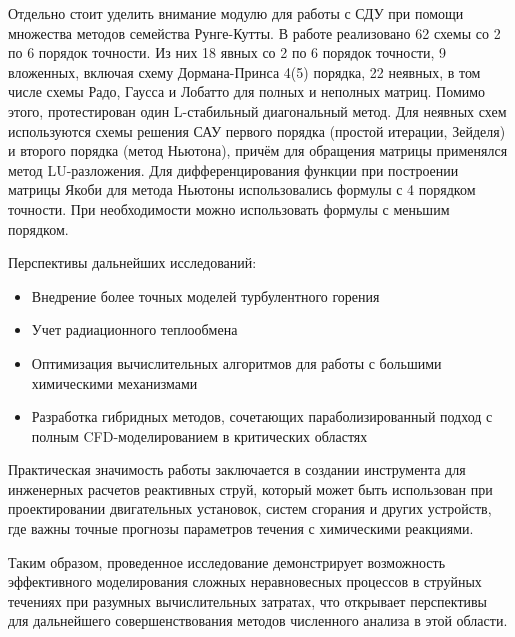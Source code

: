 Отдельно стоит уделить внимание модулю для работы с СДУ при помощи множества методов семейства Рунге-Кутты. В работе реализовано 62 схемы со 2 по 6 порядок точности. Из них 18 явных со 2 по 6 порядок точности, 9 вложенных, включая схему Дормана-Принса 4(5) порядка, 22 неявных, в том числе схемы Радо, Гаусса и Лобатто для полных и неполных матриц. Помимо этого, протестирован один L-стабильный диагональный метод. Для неявных схем используются схемы решения САУ первого порядка (простой итерации, Зейделя) и второго порядка (метод Ньютона), причём для обращения матрицы применялся метод LU-разложения. Для дифференцирования функции при построении матрицы Якоби для метода Ньютоны использовались формулы с 4 порядком точности. При необходимости можно использовать формулы с меньшим порядком.

Перспективы дальнейших исследований:
\begin{itemize}
    \item Внедрение более точных моделей турбулентного горения
    \item Учет радиационного теплообмена
    \item Оптимизация вычислительных алгоритмов для работы с большими химическими механизмами
    \item Разработка гибридных методов, сочетающих параболизированный подход с полным CFD-моделированием в критических областях
\end{itemize}

Практическая значимость работы заключается в создании инструмента для инженерных расчетов реактивных струй, который может быть использован при проектировании двигательных установок, систем сгорания и других устройств, где важны точные прогнозы параметров течения с химическими реакциями.

Таким образом, проведенное исследование демонстрирует возможность эффективного моделирования сложных неравновесных процессов в струйных течениях при разумных вычислительных затратах, что открывает перспективы для дальнейшего совершенствования методов численного анализа в этой области.